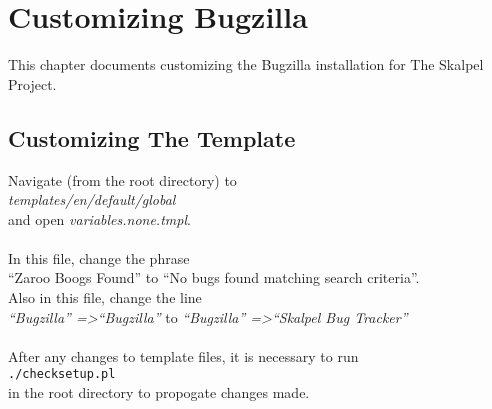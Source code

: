 \documentclass[11pt, a4paper]{report}%
\begin{document}
\chapter{Customizing Bugzilla}
\label{ch:custombugzilla}
This chapter documents customizing the Bugzilla installation for The Skalpel Project.


\section{Customizing The Template}
\label{sec:customtemplate}
Navigate (from the root directory) to\\
\emph{templates/en/default/global}\\
and open \emph{variables.none.tmpl}.\\
\\
In this file, change the phrase\\
``Zaroo Boogs Found'' to ``No bugs found matching search criteria''.\\
Also in this file, change the line\\
\emph{``Bugzilla'' =\textgreater ``Bugzilla''} to \emph{``Bugzilla'' =\textgreater ``Skalpel Bug Tracker''}\\
\\
After any changes to template files, it is necessary to run\\
{\tt ./checksetup.pl}\\
in the root directory to propogate changes made.
\end{document}
